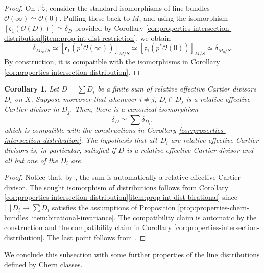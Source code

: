 \documentclass[JEP,XML,SOM,Unicode,published]{cedram}
\theoremstyle{plain}
\newtheorem{corollary}[theorem]{Corollary}
\theoremstyle{definition}
\newcommand{\PBbb}{\mathbb P}
\newcommand{\Ocal}{\mathcal O}
\newcommand{\cfrak}{\mathfrak c}
\begin{document}
\begin{proof}
On $\PBbb^{1}_{S}$, consider the standard isomorphisms of line bundles $\Ocal(\infty)\simeq\Ocal(0)$. Pulling these back to $M$, and using the isomorphism $[\cfrak_{1}(\Ocal(D))]\simeq\delta_{D}$ provided by Corollary \ref{cor:properties-intersection-distribution}\eqref{item:prop-int-dist-restriction}, we obtain
\begin{displaymath}
\delta_{M_\infty/S}\simeq [\cfrak_{1}(p^\ast \Ocal(\infty))]_{M/S} \simeq [\cfrak_{1}(p^\ast \Ocal(0))]_{M/S} \simeq \delta_{M_0/S}.
\end{displaymath}
By construction, it is compatible with the isomorphisms in Corollary \ref{cor:properties-intersection-distribution}.
\end{proof}

\begin{corollary}
Let $D = \sum D_i$ be a finite sum of relative effective Cartier divisors~$D_i$ on $X$. Suppose moreover that whenever $i\neq j$, $D_i \cap D_j$ is a relative effective Cartier divisor in $D_j$. Then, there is a canonical isomorphism
\begin{displaymath}
\delta_{D}\simeq \sum \delta_{D_i},
\end{displaymath}
which is compatible with the constructions in Corollary \ref{cor:properties-intersection-distribution}. The hypothesis that all~$D_i$ are relative effective Cartier divisors is, in particular, satisfied if $D$ is a relative effective Cartier divisor and all but one of the $D_i$ are.
\end{corollary}
\begin{proof}
Notice that, by \cite[\href{https://stacks.math.columbia.edu/tag/0B8V}{0B8U}]{stacks-project}, the sum is automatically a relative effective Cartier divisor. The sought isomorphism of distributions follows from Corollary \ref{cor:properties-intersection-distribution}\eqref{item:prop-int-dist-birational} since $\bigsqcup D_i \to \sum D_i$ satisfies the assumptions of Proposition \ref{prop:properties-chern-bundles}\eqref{item:birational-invariance}. The compatibility claim is automatic by the construction and the compatibility claim in Corollary \ref{cor:properties-intersection-distribution}. The last point follows from \cite[\href{https://stacks.math.columbia.edu/tag/0B8V}{0B8V}]{stacks-project}.
\end{proof}

We conclude this subsection with some further properties of the line distributions defined by Chern classes.
\end{document}
